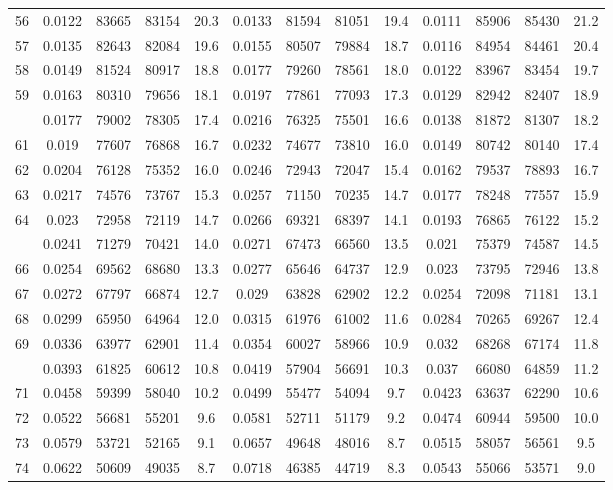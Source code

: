 \documentclass[
  14pt,
]{article}
\begin{document}
\begin{longtable}[t]{lcccccccccccc}
56 & 0.0122 & 83665 & 83154 & 20.3 & 0.0133 & 81594 & 81051 & 19.4 & 0.0111 & 85906 & 85430 & 21.2\\
57 & 0.0135 & 82643 & 82084 & 19.6 & 0.0155 & 80507 & 79884 & 18.7 & 0.0116 & 84954 & 84461 & 20.4\\
58 & 0.0149 & 81524 & 80917 & 18.8 & 0.0177 & 79260 & 78561 & 18.0 & 0.0122 & 83967 & 83454 & 19.7\\
59 & 0.0163 & 80310 & 79656 & 18.1 & 0.0197 & 77861 & 77093 & 17.3 & 0.0129 & 82942 & 82407 & 18.9\\
\addlinespace
60 & 0.0177 & 79002 & 78305 & 17.4 & 0.0216 & 76325 & 75501 & 16.6 & 0.0138 & 81872 & 81307 & 18.2\\
61 & 0.019 & 77607 & 76868 & 16.7 & 0.0232 & 74677 & 73810 & 16.0 & 0.0149 & 80742 & 80140 & 17.4\\
62 & 0.0204 & 76128 & 75352 & 16.0 & 0.0246 & 72943 & 72047 & 15.4 & 0.0162 & 79537 & 78893 & 16.7\\
63 & 0.0217 & 74576 & 73767 & 15.3 & 0.0257 & 71150 & 70235 & 14.7 & 0.0177 & 78248 & 77557 & 15.9\\
64 & 0.023 & 72958 & 72119 & 14.7 & 0.0266 & 69321 & 68397 & 14.1 & 0.0193 & 76865 & 76122 & 15.2\\
\addlinespace
65 & 0.0241 & 71279 & 70421 & 14.0 & 0.0271 & 67473 & 66560 & 13.5 & 0.021 & 75379 & 74587 & 14.5\\
66 & 0.0254 & 69562 & 68680 & 13.3 & 0.0277 & 65646 & 64737 & 12.9 & 0.023 & 73795 & 72946 & 13.8\\
67 & 0.0272 & 67797 & 66874 & 12.7 & 0.029 & 63828 & 62902 & 12.2 & 0.0254 & 72098 & 71181 & 13.1\\
68 & 0.0299 & 65950 & 64964 & 12.0 & 0.0315 & 61976 & 61002 & 11.6 & 0.0284 & 70265 & 69267 & 12.4\\
69 & 0.0336 & 63977 & 62901 & 11.4 & 0.0354 & 60027 & 58966 & 10.9 & 0.032 & 68268 & 67174 & 11.8\\
\addlinespace
70 & 0.0393 & 61825 & 60612 & 10.8 & 0.0419 & 57904 & 56691 & 10.3 & 0.037 & 66080 & 64859 & 11.2\\
71 & 0.0458 & 59399 & 58040 & 10.2 & 0.0499 & 55477 & 54094 & 9.7 & 0.0423 & 63637 & 62290 & 10.6\\
72 & 0.0522 & 56681 & 55201 & 9.6 & 0.0581 & 52711 & 51179 & 9.2 & 0.0474 & 60944 & 59500 & 10.0\\
73 & 0.0579 & 53721 & 52165 & 9.1 & 0.0657 & 49648 & 48016 & 8.7 & 0.0515 & 58057 & 56561 & 9.5\\
74 & 0.0622 & 50609 & 49035 & 8.7 & 0.0718 & 46385 & 44719 & 8.3 & 0.0543 & 55066 & 53571 & 9.0\\

\end{longtable}
\end{document}
